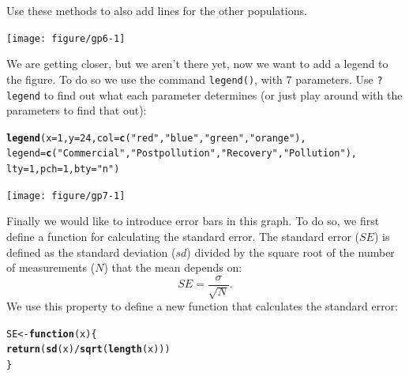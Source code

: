 \documentclass{article}\usepackage[]{graphicx}\usepackage[]{color}
\makeatletter
\newcommand{\hlnum}[1]{\textcolor[rgb]{0.686,0.059,0.569}{#1}}%
\newcommand{\hlstr}[1]{\textcolor[rgb]{0.192,0.494,0.8}{#1}}%
\newcommand{\hlopt}[1]{\textcolor[rgb]{0,0,0}{#1}}%
\newcommand{\hlstd}[1]{\textcolor[rgb]{0.345,0.345,0.345}{#1}}%
\newcommand{\hlkwa}[1]{\textcolor[rgb]{0.161,0.373,0.58}{\textbf{#1}}}%
\newcommand{\hlkwb}[1]{\textcolor[rgb]{0.69,0.353,0.396}{#1}}%
\newcommand{\hlkwc}[1]{\textcolor[rgb]{0.333,0.667,0.333}{#1}}%
\newcommand{\hlkwd}[1]{\textcolor[rgb]{0.737,0.353,0.396}{\textbf{#1}}}%
\newenvironment{kframe}{%
 \def\at@end@of@kframe{}%
 \ifinner\ifhmode%
  \def\at@end@of@kframe{\end{minipage}}%
  \begin{minipage}{\columnwidth}%
 \fi\fi%
 \def\FrameCommand##1{\hskip\@totalleftmargin \hskip-\fboxsep
 \colorbox{shadecolor}{##1}\hskip-\fboxsep
     \hskip-\linewidth \hskip-\@totalleftmargin \hskip\columnwidth}%
 \MakeFramed {\advance\hsize-\width
   \@totalleftmargin\z@ \linewidth\hsize
   \@setminipage}}%
 {\par\unskip\endMakeFramed%
 \at@end@of@kframe}
\newenvironment{knitrout}{}{} %
\makeatother
\begin{document}
Use these methods to also add lines for the other populations.\\
\begin{knitrout}
\color{fgcolor}

{\centering \texttt{[image: figure/gp6-1]} 

}



\end{knitrout}
We are getting closer, but we aren't there yet, now we want to add a legend to the figure. To do so we use the command \texttt{legend()}, with $7$ parameters. Use \texttt{?legend} to find out what each parameter determines (or just play around with the parameters to find that out):
\begin{knitrout}
\color{fgcolor}\begin{kframe}
\begin{alltt}
\hlkwd{legend}\hlstd{(}\hlkwc{x}\hlstd{=}\hlnum{1}\hlstd{,} \hlkwc{y}\hlstd{=}\hlnum{24}\hlstd{,} \hlkwc{col}\hlstd{=}\hlkwd{c}\hlstd{(}\hlstr{"red"}\hlstd{,}\hlstr{"blue"}\hlstd{,}\hlstr{"green"}\hlstd{,}\hlstr{"orange"}\hlstd{),}
\hlkwc{legend}\hlstd{=}\hlkwd{c}\hlstd{(}\hlstr{"Commercial"}\hlstd{,} \hlstr{"Postpollution"}\hlstd{,} \hlstr{"Recovery"}\hlstd{,} \hlstr{"Pollution"}\hlstd{),}
\hlkwc{lty}\hlstd{=}\hlnum{1}\hlstd{,} \hlkwc{pch}\hlstd{=}\hlnum{1}\hlstd{,} \hlkwc{bty}\hlstd{=}\hlstr{"n"}\hlstd{)}
\end{alltt}
\end{kframe}

{\centering \texttt{[image: figure/gp7-1]} 

}



\end{knitrout}
Finally we would like to introduce error bars in this graph. To do so, we first define a function for calculating the standard error. The standard error ($SE$) is defined as the standard deviation ($sd$) divided by the square root of the number of measurements ($N$) that the mean depends on:
\begin{equation*}
SE = \frac{\sigma}{\sqrt{N}}.
\end{equation*}
We use this property to define a new function that calculates the standard error:
\begin{knitrout}
\color{fgcolor}\begin{kframe}
\begin{alltt}
\hlstd{SE} \hlkwb{<-} \hlkwa{function}\hlstd{(}\hlkwc{x}\hlstd{)\{}
  \hlkwd{return}\hlstd{(}\hlkwd{sd}\hlstd{(x)} \hlopt{/} \hlkwd{sqrt}\hlstd{(}\hlkwd{length}\hlstd{(x)))}
\hlstd{\}}
\end{alltt}
\end{kframe}
\end{knitrout}
\end{document}
